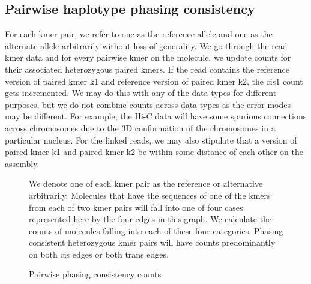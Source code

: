 \subsection{Pairwise haplotype phasing consistency}
\par{
For each kmer pair, we refer to one as the reference allele and one as the alternate allele arbitrarily without loss of generality. We go through the read kmer data and for every pairwise kmer on the molecule, we update counts for their associated heterozygous paired kmers. If the read contains the reference version of paired kmer k1 and reference version of paired kmer k2, the cis1 count gets incremented. We may do this with any of the data types for different purposes, but we do not combine counts across data types as the error modes may be different. For example, the Hi-C data will have some spurious connections across chromosomes due to the 3D conformation of the chromosomes in a particular nucleus. For the linked reads, we may also stipulate that a version of paired kmer k1 and paired kmer k2 be within some distance of each other on the assembly.
}


\begin{figure}[htbp!]
\caption{Pairwise phasing consistency counts}\label{figure:consistency}
\centering
{}
\par{
We denote one of each kmer pair as the reference or alternative arbitrarily. Molecules that have the sequences of one of the kmers from each of two kmer pairs will fall into one of four cases represented here by the four edges in this graph. We calculate the counts of molecules falling into each of these four categories. Phasing consistent heterozygous kmer pairs will have counts predominantly on both cis edges or both trans edges.
}
\end{figure}

